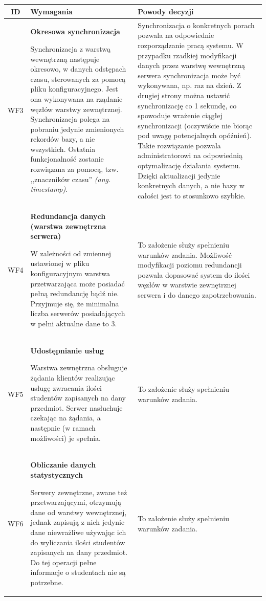 \begin{tabularx}{\textwidth}{|c|X|X|}
\hline
\textbf{ID} & \textbf{Wymagania}  & \textbf{Powody decyzji} \\
\hline

\label{z:WF3} WF3 & \textbf{Okresowa synchronizacja}

 Synchronizacja z warstwą wewnętrzną następuje okresowo, w danych odstępach czasu, sterowanych za pomocą pliku konfiguracyjnego. Jest ona wykonywana na rządanie węzłów warstwy zewnętrznej. Synchronizacja polega na pobraniu jedynie zmienionych rekordów bazy, a nie wszystkich. Ostatnia funkcjonalność zostanie rozwiązana za pomocą, tzw. ,,znaczników czasu'' \textit{(ang. timestamp)}. & Synchronizacja o konkretnych porach pozwala na odpowiednie rozporządzanie pracą systemu. W przypadku rzadkiej modyfikacji danych przez warstwę wewnętrzną serwera synchronizacja może być wykonywana, np. raz na dzień. Z drugiej strony można ustawić synchronizację co 1 sekundę, co spowoduje wrażenie ciągłej synchronizacji (oczywiście nie biorąc pod uwagę potencjalnych opóźnień). Takie rozwiązanie pozwala administratorowi na odpowiednią optymalizację działania systemu. Dzięki aktualizacji jedynie konkretnych danych, a nie bazy w całości jest to stosunkowo szybkie. \\
\hline

\label{z:WF4} WF4 & \textbf{Redundancja danych (warstwa zewnętrzna serwera)}

W zależności od zmiennej ustawionej w pliku konfiguracyjnym warstwa przetwarzająca może posiadać pełną redundancję bądź nie. Przyjmuje się, że minimalna liczba serwerów posiadających w pełni aktualne dane to 3. & To założenie służy spełnieniu warunków zadania. Możliwość modyfikacji poziomu redundancji pozwala dopasować system do ilości węzłów w warstwie zewnętrznej serwera i do danego zapotrzebowania.\\
\hline

\label{z:WF5} WF5 & \textbf{Udostępnianie usług }

 Warstwa zewnętrzna obsługuje żądania klientów realizując usługę zwracania ilości studentów zapisanych na dany przedmiot. Serwer nasłuchuje czekając na żądania, a następnie (w ramach możliwości) je spełnia. & To założenie służy spełnieniu warunków zadania. \\
\hline



\label{z:WF6} WF6 & \textbf{Obliczanie danych statystycznych }

  Serwery zewnętrzne, zwane też przetwarzającymi, otrzymują dane od warstwy wewnętrznej, jednak zapisują z nich jedynie dane niewrażliwe używając ich do wyliczania ilości studentów zapisanych na dany przedmiot. Do tej operacji pełne informacje o studentach nie są potrzebne. & 
To założenie służy spełnieniu warunków zadania. \\
\hline

\end{tabularx}
